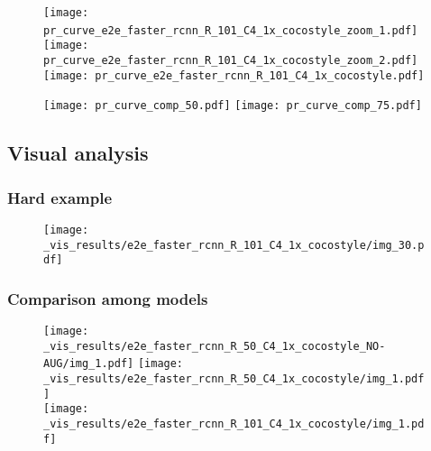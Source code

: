 \documentclass{beamer}
\begin{document}
		\begin{frame}%
			\begin{figure}[htb!]
				\centering
				\texttt{[image: pr\_curve\_e2e\_faster\_rcnn\_R\_101\_C4\_1x\_cocostyle\_zoom\_1.pdf]}~
				\texttt{[image: pr\_curve\_e2e\_faster\_rcnn\_R\_101\_C4\_1x\_cocostyle\_zoom\_2.pdf]}\\
				\vspace{.5mm}
				\texttt{[image: pr\_curve\_e2e\_faster\_rcnn\_R\_101\_C4\_1x\_cocostyle.pdf]}
				\label{fig:pr_R101C4}
			\end{figure}
		\end{frame}


		\begin{frame}%
			\begin{figure}[htb!]
				\centering
				\texttt{[image: pr\_curve\_comp\_50.pdf]}
				\texttt{[image: pr\_curve\_comp\_75.pdf]}
				\label{fig:prec-rec_curve}
			\end{figure}
		\end{frame}


	\subsection{Visual analysis}

		\begin{frame}\frametitle{Hard example}
			\begin{figure}[h!]
				\centering
				\texttt{[image: \_vis\_results/e2e\_faster\_rcnn\_R\_101\_C4\_1x\_cocostyle/img\_30.pdf]}
				\label{fig:hard}
			\end{figure}
		\end{frame}


		\begin{frame}\frametitle{Comparison among models}
			\begin{figure}[htb!]
				\centering
				\texttt{[image: \_vis\_results/e2e\_faster\_rcnn\_R\_50\_C4\_1x\_cocostyle\_NO-AUG/img\_1.pdf]}
				\texttt{[image: \_vis\_results/e2e\_faster\_rcnn\_R\_50\_C4\_1x\_cocostyle/img\_1.pdf]}\\
				\vspace{3mm}
				\texttt{[image: \_vis\_results/e2e\_faster\_rcnn\_R\_101\_C4\_1x\_cocostyle/img\_1.pdf]}
  			\label{fig:improv_1}
			\end{figure}
		\end{frame}
\end{document}
